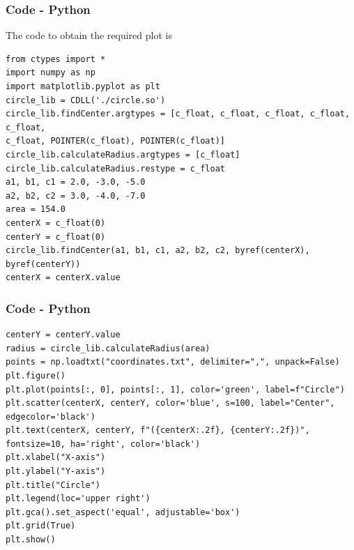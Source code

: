 \documentclass{beamer}
\theoremstyle{remark}
\numberwithin{equation}{section}
\begin{document}
\begin{frame}[fragile]
    \frametitle{Code - Python}
    The code to obtain the required plot is
    \begin{lstlisting}
from ctypes import *
import numpy as np
import matplotlib.pyplot as plt
circle_lib = CDLL('./circle.so')
circle_lib.findCenter.argtypes = [c_float, c_float, c_float, c_float, c_float,                                                       c_float, POINTER(c_float), POINTER(c_float)]
circle_lib.calculateRadius.argtypes = [c_float]
circle_lib.calculateRadius.restype = c_float
a1, b1, c1 = 2.0, -3.0, -5.0  
a2, b2, c2 = 3.0, -4.0, -7.0  
area = 154.0  
centerX = c_float(0)
centerY = c_float(0)
circle_lib.findCenter(a1, b1, c1, a2, b2, c2, byref(centerX), byref(centerY))
centerX = centerX.value
\end{lstlisting}
\end{frame}
\begin{frame}[fragile]
    \frametitle{Code - Python}
\begin{lstlisting}
centerY = centerY.value 
radius = circle_lib.calculateRadius(area)
points = np.loadtxt("coordinates.txt", delimiter=",", unpack=False)
plt.figure()
plt.plot(points[:, 0], points[:, 1], color='green', label=f"Circle")
plt.scatter(centerX, centerY, color='blue', s=100, label="Center", edgecolor='black')  
plt.text(centerX, centerY, f"({centerX:.2f}, {centerY:.2f})", fontsize=10, ha='right', color='black')
plt.xlabel("X-axis")
plt.ylabel("Y-axis")
plt.title("Circle")
plt.legend(loc='upper right')
plt.gca().set_aspect('equal', adjustable='box')
plt.grid(True)
plt.show()
    \end{lstlisting}
    \end{frame}
\end{document}

